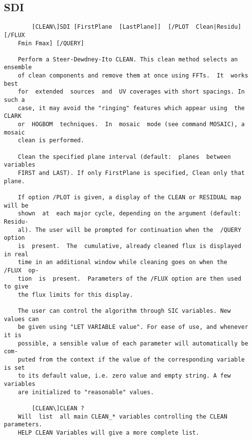 \subsection{SDI}
\begin{verbatim}
        [CLEAN\]SDI [FirstPlane  [LastPlane]]  [/PLOT  Clean|Residu]  [/FLUX
    Fmin Fmax] [/QUERY]

    Perform a Steer-Dewdney-Ito CLEAN. This clean method selects an ensemble
    of clean components and remove them at once using FFTs.  It  works  best
    for  extended  sources  and  UV coverages with short spacings. In such a
    case, it may avoid the "ringing" features which appear using  the  CLARK
    or  HOGBOM  techniques.  In  mosaic  mode (see command MOSAIC), a mosaic
    clean is performed.

    Clean the specified plane interval (default:  planes  between  variables
    FIRST and LAST). If only FirstPlane is specified, Clean only that plane.

    If option /PLOT is given, a display of the CLEAN or RESIDUAL map will be
    shown  at  each major cycle, depending on the argument (default: Residu-
    al). The user will be prompted for continuation when the  /QUERY  option
    is  present.  The  cumulative, already cleaned flux is displayed in real
    time in an additional window while cleaning goes on when the  /FLUX  op-
    tion  is  present.  Parameters of the /FLUX option are then used to give
    the flux limits for this display.

    The user can control the algorithm through SIC variables. New values can
    be given using "LET VARIABLE value". For ease of use, and whenever it is
    possible, a sensible value of each parameter will automatically be  com-
    puted from the context if the value of the corresponding variable is set
    to its default value, i.e. zero value and empty string. A few  variables
    are initialized to "reasonable" values.

        [CLEAN\]CLEAN ?
    Will  list  all main CLEAN_* variables controlling the CLEAN parameters.
    HELP CLEAN Variables will give a more complete list.
\end{verbatim}
